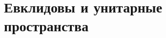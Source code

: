 \documentclass[../main.tex]{subfiles}
\begin{document}
\chapter{Евклидовы и унитарные пространства}

\end{document}
